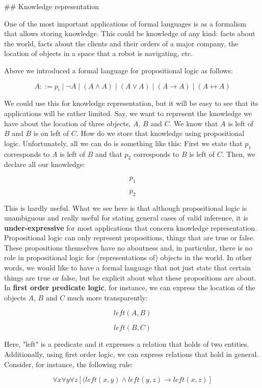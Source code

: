 \documentclass[11pt]{article}
\begin{document}
\#\# Knowledge representation

One of the most important applications of formal languages is as a formalism that allows storing knowledge. This could be knowledge of any kind: facts about the world, facts about the clients and their orders of a major company, the location of objects in a space that a robot is navigating, etc.

Above we introduced a formal language for propositional logic as follows:

$$A::= p_i\mid\neg A\mid (A\land A)\mid (A\lor A)\mid (A\rightarrow A)\mid (A\leftrightarrow A)$$

We could use this for knowledge representation, but it will be easy to see that its applications will be rather limited. Say, we want to represent the knowledge we have about the location of three objects, \(A\), \(B\) and \(C\). We know that \(A\) is left of \(B\) and \(B\) is on left of \(C\). How do we store that knowledge using propositional logic. Unfortunately, all we can do is something like this: First we state that \(p_1\) corresponds to \(A\) is left of \(B\) and that \(p_2\) corresponds to \(B\) is left of \(C\). Then, we declare all our knowledge:

$$p_1$$

$$p_2$$

This is hardly useful. What we see here is that although propositional logic is unambiguous and really useful for stating general cases of valid inference, it is \textbf{\textbf{under-expressive}} for most applications that concern knowledge representation. Propositional logic can only represent propositions, things that are true or false. These propositions themselves have no aboutness and, in particular, there is no role in propositional logic for (representations of) objects in the world. In other words, we would like to have a formal language that not just state that certain things are true or false, but be explicit about what these propositions are about. In \textbf{\textbf{first order predicate logic}}, for instance, we can express the location of the objects \(A\), \(B\) and \(C\) much more transparently:

$$left(A,B)$$

$$left(B,C)$$

Here, "left" is a predicate and it expresses a relation that holds of two entities. Additionally, using first order logic, we can express relations that hold in general. Consider, for instance, the following rule:

$$\forall x\forall y\forall z[(left(x,y)\land left(y,z)\rightarrow left(x,z)]$$
\end{document}
